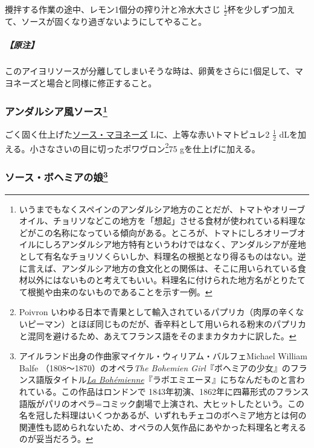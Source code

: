\begin{recette}
攪拌する作業の途中、レモン1個分の搾り汁と冷水大さじ
\(\frac{1}{2}\)杯を少しずつ加えて、ソースが固くなり過ぎないようにしてやること。

\hypertarget{nota-sauce-aioli}{%
\subparagraph{【原注】}\label{nota-sauce-aioli}}

このアイヨリソースが分離してしまいそうな時は、卵黄をさらに1個足して、マヨネーズと場合と同様に修正すること。

\atoaki{}

\hypertarget{sauce-andalouse}{%
\subsubsection[アンダルシア風ソース]{\texorpdfstring{アンダルシア風ソース\footnote{いうまでもなくスペインのアンダルシア地方のことだが、トマトやオリーブオイル、チョリソなどこの地方を「想起」させる食材が使われている料理などがこの名称になっている傾向がある。ところが、トマトにしろオリーブオイルにしろアンダルシア地方特有というわけではなく、アンダルシアが産地として有名なチョリソくらいしか、料理名の根拠となり得るものはない。逆に言えば、アンダルシア地方の食文化との関係は、そこに用いられている食材以外にはないものと考えてもいい。料理名に付けられた地方名がとりたてて根拠や由来のないものであることを示す一例。}}{アンダルシア風ソース}}\label{sauce-andalouse}}



ごく固く仕上げた\protect\hyperlink{mayonnaise}{ソース・マヨネーズ}\troisquarts{}
Lに、上等な赤いトマトピュレ2 \(\frac{1}{2}\)
dLを加える。小さなさいの目に切ったポワヴロン\footnote{Poivron
  いわゆる日本で青果として輸入されているパプリカ（肉厚の辛くないピーマン）とほぼ同じものだが、香辛料として用いられる粉末のパプリカと混同を避けるため、あえてフランス語をそのままカタカナに訳した。}75
gを仕上げに加える。

\atoaki{}

\hypertarget{sauce-bohemienne}{%
\subsubsection[ソース・ボヘミアの娘]{\texorpdfstring{ソース・ボヘミアの娘\footnote{アイルランド出身の作曲家マイケル・ウィリアム・バルフェMichael
  William Balfe （1808〜1870）のオペラ\emph{The Bohemien
  Girl}『ボヘミアの少女』のフランス語版タイトル\href{https://archive.org/details/labohmiennegrand00balf}{\emph{La
  Bohémienne}}『ラボエミエーヌ』にちなんだものと言われている。この作品はロンドンで
  1843年初演、1862年に四幕形式のフランス語版がパリのオペラ=コミック劇場で上演され、大ヒットしたという。この名を冠した料理はいくつかあるが、いずれもチェコのボヘミア地方とは何の関連性も認められないため、オペラの人気作品にあやかった料理名と考えるのが妥当だろう。}}{ソース・ボヘミアの娘}}\label{sauce-bohemienne}}


\end{recette}
